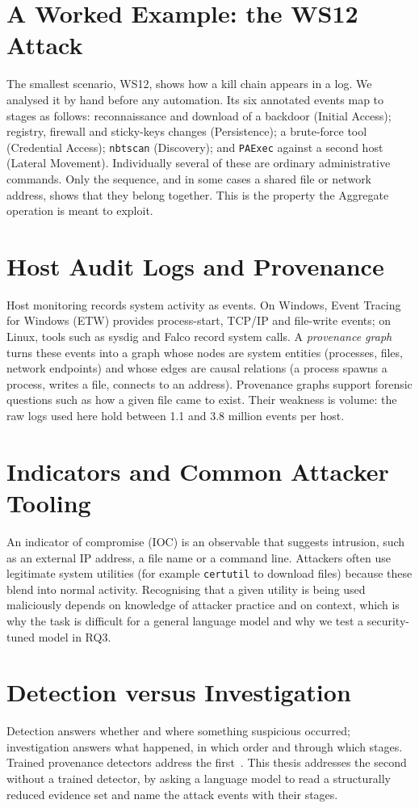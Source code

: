 \section{A Worked Example: the WS12 Attack}
The smallest scenario, WS12, shows how a kill chain appears in a log. We analysed it by hand before any automation. Its six annotated events map to stages as follows: reconnaissance and download of a backdoor (Initial Access); registry, firewall and sticky-keys changes (Persistence); a brute-force tool (Credential Access); \texttt{nbtscan} (Discovery); and \texttt{PAExec} against a second host (Lateral Movement). Individually several of these are ordinary administrative commands. Only the sequence, and in some cases a shared file or network address, shows that they belong together. This is the property the Aggregate operation is meant to exploit.

\section{Host Audit Logs and Provenance}
Host monitoring records system activity as events. On Windows, Event Tracing for Windows (ETW) provides process-start, TCP/IP and file-write events; on Linux, tools such as sysdig and Falco record system calls. A \emph{provenance graph} turns these events into a graph whose nodes are system entities (processes, files, network endpoints) and whose edges are causal relations (a process spawns a process, writes a file, connects to an address). Provenance graphs support forensic questions such as how a given file came to exist. Their weakness is volume: the raw logs used here hold between 1.1 and 3.8 million events per host.

\section{Indicators and Common Attacker Tooling}
An indicator of compromise (IOC) is an observable that suggests intrusion, such as an external IP address, a file name or a command line. Attackers often use legitimate system utilities (for example \texttt{certutil} to download files) because these blend into normal activity. Recognising that a given utility is being used maliciously depends on knowledge of attacker practice and on context, which is why the task is difficult for a general language model and why we test a security-tuned model in RQ3.

\section{Detection versus Investigation}
Detection answers whether and where something suspicious occurred; investigation answers what happened, in which order and through which stages. Trained provenance detectors address the first~\cite{li2024nodlink}. This thesis addresses the second without a trained detector, by asking a language model to read a structurally reduced evidence set and name the attack events with their stages.

